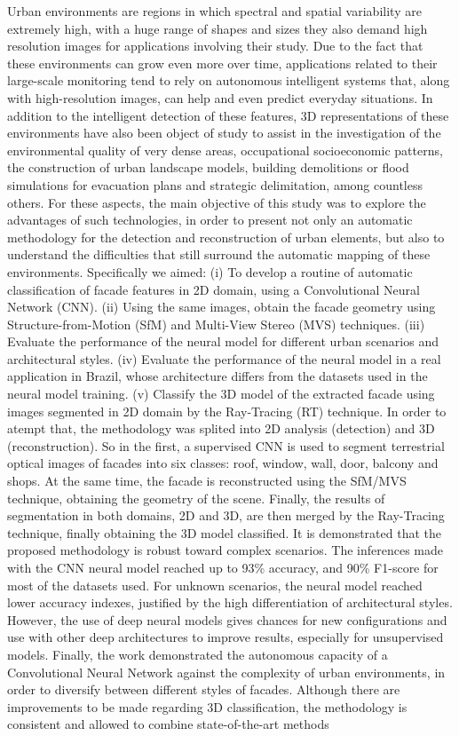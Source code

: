 \begin{resumo}
Urban environments are regions in which spectral and spatial variability are extremely high, with a huge range of shapes and sizes they also demand high resolution images for applications involving their study. Due to the fact that these environments can grow even more over time, applications related to their large-scale monitoring tend to rely on autonomous intelligent systems that, along with high-resolution images, can help and even predict everyday situations. In addition to the intelligent detection of these features, 3D representations of these environments have also been object of study to assist in the investigation of the environmental quality of very dense areas, occupational socioeconomic patterns, the construction of urban landscape models, building demolitions or flood simulations for evacuation plans and strategic delimitation, among countless others. For these aspects, the main objective of this study was to explore the advantages of such technologies, in order to present not only an automatic methodology for the detection and reconstruction of urban elements, but also to understand the difficulties that still surround the automatic mapping of these environments. Specifically we aimed: (i) To develop a routine of automatic classification of facade features in 2D domain, using a Convolutional Neural Network (CNN). (ii) Using the same images, obtain the facade geometry using Structure-from-Motion (SfM) and Multi-View Stereo (MVS) techniques. (iii) Evaluate the performance of the neural model for different urban scenarios and architectural styles. (iv) Evaluate the performance of the neural model in a real application in Brazil, whose architecture differs from the datasets used in the neural model training. (v) Classify the 3D model of the extracted facade using images segmented in 2D domain by the Ray-Tracing (RT) technique. In order to atempt that, the methodology was splited into 2D analysis (detection) and 3D (reconstruction). So in the first, a supervised CNN is used to segment terrestrial optical images of facades into six classes: roof, window, wall, door, balcony and shops. At the same time, the facade is reconstructed using the SfM/MVS technique, obtaining the geometry of the scene. Finally, the results of segmentation in both domains, 2D and 3D, are then merged by the Ray-Tracing technique, finally obtaining the 3D model classified. It is demonstrated that the proposed methodology is robust toward complex scenarios. The inferences made with the CNN neural model reached up to 93\% accuracy, and 90\% F1-score for most of the datasets used. For unknown scenarios, the neural model reached lower accuracy indexes, justified by the high differentiation of architectural styles. However, the use of deep neural models gives chances for new configurations and use with other deep architectures to improve results, especially for unsupervised models. Finally, the work demonstrated the autonomous capacity of a Convolutional Neural Network against the complexity of urban environments, in order to diversify between different styles of facades. Although there are improvements to be made regarding 3D classification, the methodology is consistent and allowed to combine state-of-the-art methods 
\end{resumo}
